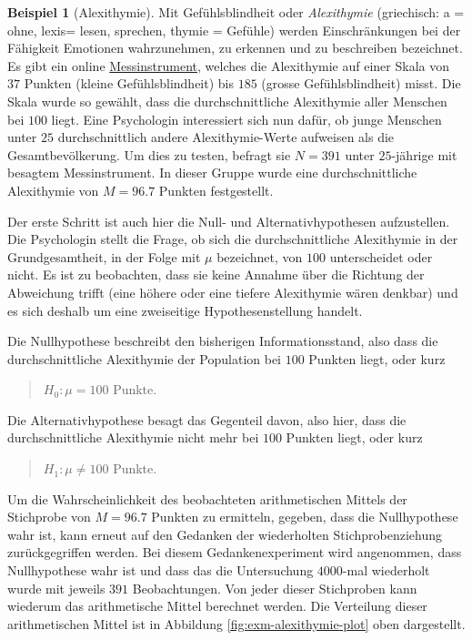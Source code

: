 \documentclass[
]{book}
\theoremstyle{definition}
\theoremstyle{definition}
\newtheorem{example}{Beispiel}[chapter]
\theoremstyle{definition}
\theoremstyle{definition}
\theoremstyle{remark}
\begin{document}
\begin{example}[Alexithymie]
\protect\hypertarget{exm:alexithymie}{}\label{exm:alexithymie}Mit Gefühlsblindheit oder \emph{Alexithymie} (griechisch: a = ohne, lexis= lesen, sprechen, thymie = Gefühle) werden Einschränkungen bei der Fähigkeit Emotionen wahrzunehmen, zu erkennen und zu beschreiben bezeichnet. Es gibt ein online \href{https://www.alexithymie.com/de/}{Messinstrument}, welches die Alexithymie auf einer Skala von \(37\) Punkten (kleine Gefühlsblindheit) bis \(185\) (grosse Gefühlsblindheit) misst. Die Skala wurde so gewählt, dass die durchschnittliche Alexithymie aller Menschen bei \(100\) liegt. Eine Psychologin interessiert sich nun dafür, ob junge Menschen unter \(25\) durchschnittlich andere Alexithymie-Werte aufweisen als die Gesamtbevölkerung. Um dies zu testen, befragt sie \(N = 391\) unter \(25\)-jährige mit besagtem Messinstrument. In dieser Gruppe wurde eine durchschnittliche Alexithymie von \(M = 96.7\) Punkten festgestellt.
\end{example}

Der erste Schritt ist auch hier die Null- und Alternativhypothesen aufzustellen. Die Psychologin stellt die Frage, ob sich die durchschnittliche Alexithymie in der Grundgesamtheit, in der Folge mit \(\mu\) bezeichnet, von \(100\) unterscheidet oder nicht. Es ist zu beobachten, dass sie keine Annahme über die Richtung der Abweichung trifft (eine höhere oder eine tiefere Alexithymie wären denkbar) und es sich deshalb um eine zweiseitige Hypothesenstellung handelt.

Die Nullhypothese beschreibt den bisherigen Informationsstand, also dass die durchschnittliche Alexithymie der Population bei \(100\) Punkten liegt, oder kurz

\begin{quote}
\(H_0:\mu = 100\) Punkte.
\end{quote}

Die Alternativhypothese besagt das Gegenteil davon, also hier, dass die durchschnittliche Alexithymie nicht mehr bei \(100\) Punkten liegt, oder kurz

\begin{quote}
\(H_1: \mu \neq 100\) Punkte.
\end{quote}

Um die Wahrscheinlichkeit des beobachteten arithmetischen Mittels der Stichprobe von \(M = 96.7\) Punkten zu ermitteln, gegeben, dass die Nullhypothese wahr ist, kann erneut auf den Gedanken der wiederholten Stichprobenziehung zurückgegriffen werden. Bei diesem Gedankenexperiment wird angenommen, dass Nullhypothese wahr ist und dass das die Untersuchung \(4000\)-mal wiederholt wurde mit jeweils \(391\) Beobachtungen. Von jeder dieser Stichproben kann wiederum das arithmetische Mittel berechnet werden. Die Verteilung dieser arithmetischen Mittel ist in Abbildung \ref{fig:exm-alexithymie-plot} oben dargestellt.
\end{document}
